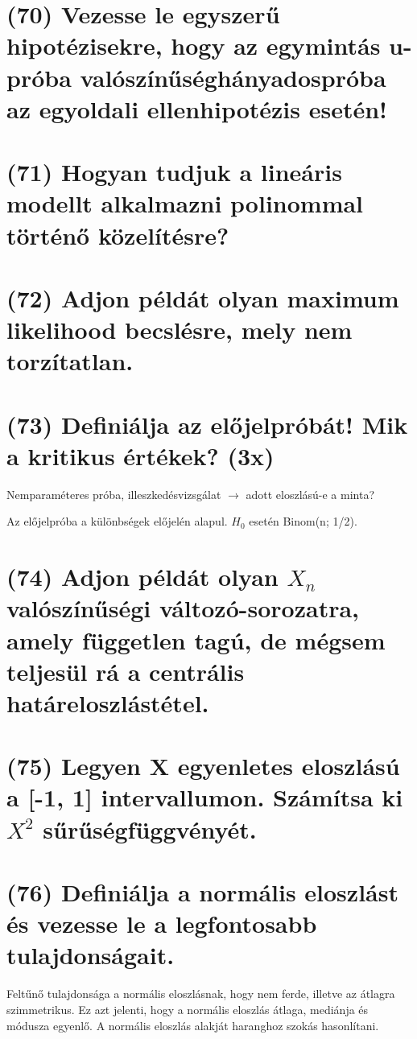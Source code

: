 \documentclass[12p]{article}
\begin{document}
\section{(70) Vezesse le egyszerű hipotézisekre, hogy az egymintás u-próba valószínűséghányadospróba az egyoldali ellenhipotézis esetén!}

\section{(71) Hogyan tudjuk a lineáris modellt alkalmazni polinommal történő közelítésre?}

\section{(72) Adjon példát olyan maximum likelihood becslésre, mely nem torzítatlan.}

\section{(73) Definiálja az előjelpróbát! Mik a kritikus értékek? (3x)}

Nemparaméteres próba, illeszkedésvizsgálat $\rightarrow$ adott eloszlású-e a minta?

Az előjelpróba a különbségek előjelén alapul. $H_0$ esetén Binom(n; 1/2).

\section{(74) Adjon példát olyan $X_n$ valószínűségi változó-sorozatra, amely független tagú, de mégsem teljesül rá a centrális határeloszlástétel.}

\section{(75) Legyen X egyenletes eloszlású a [-1, 1] intervallumon. Számítsa ki $X^2$ sűrűségfüggvényét.}

\section{(76) Definiálja a normális eloszlást és vezesse le a legfontosabb tulajdonságait.}

Feltűnő tulajdonsága a normális eloszlásnak, hogy nem ferde, illetve az átlagra szimmetrikus. Ez azt jelenti, hogy a normális eloszlás átlaga, mediánja és módusza egyenlő. A normális eloszlás alakját haranghoz szokás hasonlítani.
\end{document}
